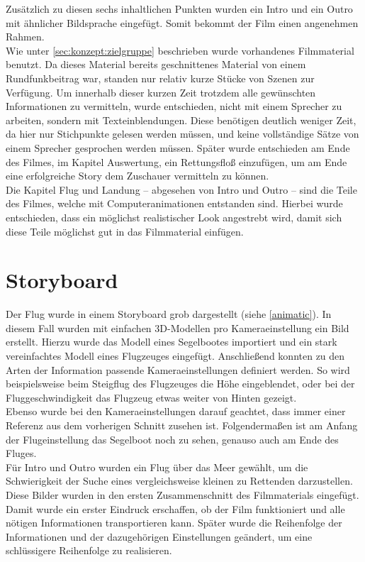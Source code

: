 Zusätzlich zu diesen sechs inhaltlichen Punkten wurden ein Intro und ein Outro mit ähnlicher Bildsprache eingefügt. Somit bekommt der Film einen angenehmen Rahmen.\\
Wie unter \autoref{sec:konzept:zielgruppe} beschrieben wurde vorhandenes Filmmaterial benutzt. Da dieses Material bereits geschnittenes Material von einem Rundfunkbeitrag war, standen nur relativ kurze Stücke von Szenen zur Verfügung. Um innerhalb dieser kurzen Zeit trotzdem alle gewünschten Informationen zu vermitteln, wurde entschieden, nicht mit einem Sprecher zu arbeiten, sondern mit Texteinblendungen. Diese benötigen deutlich weniger Zeit, da hier nur Stichpunkte gelesen werden müssen, und keine vollständige Sätze von einem Sprecher gesprochen werden müssen.
Später wurde entschieden am Ende des Filmes, im Kapitel Auswertung, ein Rettungsfloß einzufügen, um am Ende eine erfolgreiche Story dem Zuschauer vermitteln zu können.\\
Die Kapitel Flug und Landung -- abgesehen von Intro und Outro -- sind die Teile des Filmes, welche mit Computeranimationen entstanden sind. Hierbei wurde entschieden, dass ein möglichst realistischer Look angestrebt wird, damit sich diese Teile möglichst gut in das Filmmaterial einfügen.

\section{Storyboard} %
\label{sec:konzept:animatic}

Der Flug wurde in einem Storyboard grob dargestellt (siehe \autoref{animatic}). In diesem Fall wurden mit einfachen 3D-Modellen pro Kameraeinstellung ein Bild erstellt. Hierzu wurde das Modell eines Segelbootes importiert und ein stark vereinfachtes Modell eines Flugzeuges eingefügt. Anschließend konnten zu den Arten der Information passende Kameraeinstellungen definiert werden. So wird beispielsweise beim Steigflug des Flugzeuges die Höhe eingeblendet, oder bei der Fluggeschwindigkeit das Flugzeug etwas weiter von Hinten gezeigt. \\
Ebenso wurde bei den Kameraeinstellungen darauf geachtet, dass immer einer Referenz aus dem vorherigen Schnitt zusehen ist. Folgendermaßen ist am Anfang der Flugeinstellung das Segelboot noch zu sehen, genauso auch am Ende des Fluges.\\
Für Intro und Outro wurden ein Flug über das Meer gewählt, um die Schwierigkeit der Suche eines vergleichsweise kleinen zu Rettenden darzustellen.
Diese Bilder wurden in den ersten Zusammenschnitt des Filmmaterials eingefügt. Damit wurde ein erster Eindruck erschaffen, ob der Film funktioniert und alle nötigen Informationen transportieren kann. Später wurde die Reihenfolge der Informationen und der dazugehörigen Einstellungen geändert, um eine schlüssigere Reihenfolge zu realisieren.


